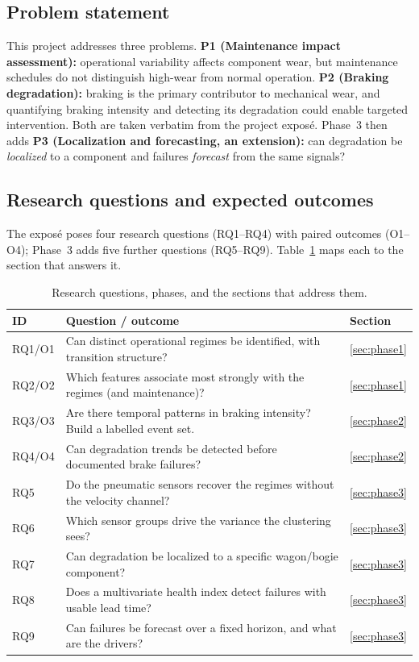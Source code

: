 \documentclass[11pt,a4paper]{article}
\begin{document}
\subsection{Problem statement}
This project addresses three problems. \textbf{P1 (Maintenance impact assessment):}
operational variability affects component wear, but maintenance schedules do not
distinguish high-wear from normal operation. \textbf{P2 (Braking degradation):} braking is
the primary contributor to mechanical wear, and quantifying braking intensity and detecting
its degradation could enable targeted intervention. Both are taken verbatim from the project
exposé. Phase~3 then adds \textbf{P3 (Localization and forecasting, an extension):} can
degradation be \emph{localized} to a component and failures \emph{forecast} from the same
signals?

\subsection{Research questions and expected outcomes}
The exposé poses four research questions (RQ1--RQ4) with paired outcomes (O1--O4); Phase~3
adds five further questions (RQ5--RQ9). Table~\ref{tab:rqs} maps each to the section that
answers it.

\begin{table}[H]
\centering
\caption{Research questions, phases, and the sections that address them.}
\label{tab:rqs}
\small
\begin{tabular}{l p{10.0cm} l}
\toprule
ID & Question / outcome & Section\\
\midrule
RQ1/O1 & Can distinct operational regimes be identified, with transition structure? & \ref{sec:phase1}\\
RQ2/O2 & Which features associate most strongly with the regimes (and maintenance)? & \ref{sec:phase1}\\
RQ3/O3 & Are there temporal patterns in braking intensity? Build a labelled event set. & \ref{sec:phase2}\\
RQ4/O4 & Can degradation trends be detected before documented brake failures? & \ref{sec:phase2}\\
RQ5 & Do the pneumatic sensors recover the regimes without the velocity channel? & \ref{sec:phase3}\\
RQ6 & Which sensor groups drive the variance the clustering sees? & \ref{sec:phase3}\\
RQ7 & Can degradation be localized to a specific wagon/bogie component? & \ref{sec:phase3}\\
RQ8 & Does a multivariate health index detect failures with usable lead time? & \ref{sec:phase3}\\
RQ9 & Can failures be forecast over a fixed horizon, and what are the drivers? & \ref{sec:phase3}\\
\bottomrule
\end{tabular}
\end{table}
\end{document}
